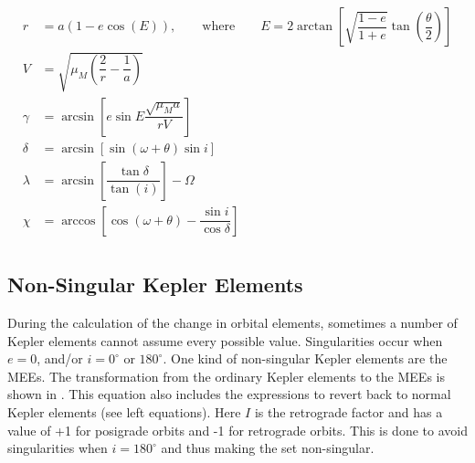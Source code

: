 \begin{equation} \label{eq:kepltospher}
\begin{split}
r&= a\left(1-e\cos\left(E\right)\right), \qquad \text{where} \qquad E=2\arctan\left[\sqrt{\dfrac{1-e}{1+e}}\tan\left(\dfrac{\theta}{2}\right)\right]\\
V&=\sqrt{\mu_{M}\left(\dfrac{2}{r}-\dfrac{1}{a}\right)}\\
\gamma&=\arcsin\left[e\sin E\dfrac{\sqrt{\mu_{M}a}}{rV}\right]\\
\delta&=\arcsin\left[\sin\left(\omega+\theta\right)\sin i\right]\\
\lambda&=\arcsin\left[\dfrac{\tan\delta }{\tan\left(i\right)}\right]-\Omega\\
\chi&=\arccos\left[\cos\left(\omega+\theta\right)-\dfrac{\sin i}{\cos\delta }\right]\\
\end{split}
\end{equation} 


\subsection{Non-Singular Kepler Elements}
\label{subsec:nosingkep}
During the calculation of the change in orbital elements, sometimes a number of Kepler elements cannot assume every possible value. Singularities occur when $e=0$, and/or $i=0^{\circ}$ or $180^{\circ}$. One kind of non-singular Kepler elements are the \ac{MEE}s. The transformation from the ordinary Kepler elements to the \ac{MEE}s is shown in . This equation also includes the expressions to revert back to normal Kepler elements (see left equations). Here  $I$ is the retrograde factor and has a value of +1 for posigrade orbits and -1 for retrograde orbits. This is done to avoid singularities when $i=180^{\circ}$ and thus making the set non-singular. 




